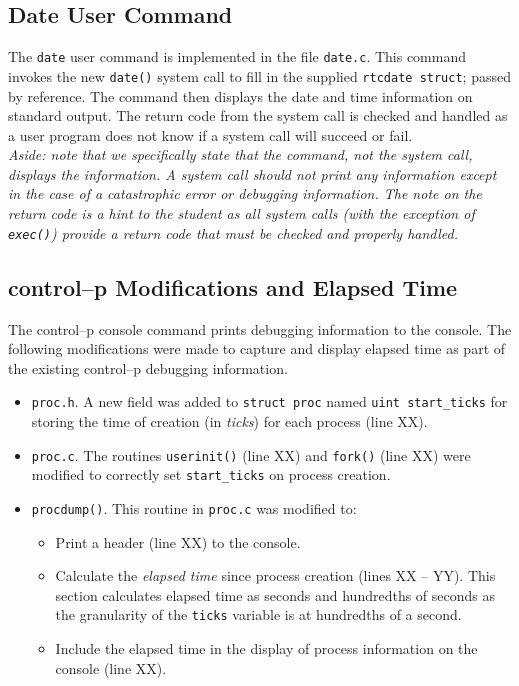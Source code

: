 \documentclass[11pt,letterpaper]{report}
\begin{document}
	\subsection*{Date User Command}
	The {\tt date} user command is implemented in the file {\tt date.c}. This command invokes the new {\tt date()} system call to fill in the supplied {\tt rtcdate struct}; passed by reference. The command then displays the date and time information on standard output. The return code from the system call is checked and handled as a user program does not know if a system call will succeed or fail. \\
	
	\noindent \emph{Aside: note that we specifically state that the command, not the system call, displays the information. A system call should not print any information except in the case of a catastrophic error or debugging information. The note on the return code is a hint to the student as all system calls (with the exception of {\tt exec()}) provide a return code that must be checked and properly handled.}
		
	\subsection*{control--p Modifications and Elapsed Time}
	The control--p console command prints debugging information to the console. The following modifications were made to capture and display elapsed time as part of the existing control--p debugging information.
	
	\begin{itemize}
	\item {\tt proc.h}. A new field was added to {\tt struct proc} named {\tt uint start\_ticks} for storing the time of creation (in \emph{ticks}) for each process ({\color{red}line XX}). 

	\item {\tt proc.c}. The routines {\tt userinit()} ({\color{red}line XX}) and {\tt fork()} ({\color{red}line XX}) were modified to correctly set  {\tt start\_ticks} on process creation.
	
	\item {\tt procdump()}. This routine in {\tt proc.c} was modified to:
	
	\begin{itemize}
	
	\item Print a  header ({\color{red}line XX}) to the console.
	
	\item Calculate the \emph{elapsed time} since process creation ({\color{red}lines XX -- YY}). This section calculates elapsed time as seconds and hundredths of seconds as the granularity of the {\tt ticks} variable is at hundredths of a second.
	
	\item Include the elapsed time in the display of process information on the console ({\color{red}line XX}).
	
	\end{itemize}
	
	\end{itemize}
	
\end{document}
